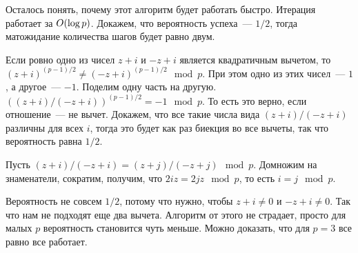 Осталось понять, почему этот алгоритм будет работать быстро. Итерация работает за $O(\log p)$. Докажем, что вероятность успеха~--- $1/2$, тогда матожидание количества шагов будет равно двум.

Если ровно одно из чисел $z + i$ и $-z + i$ является квадратичным вычетом, то $(z + i)^{(p-1)/2} \neq (-z + i)^{(p-1)/2} \mod p$. При этом одно из этих чисел~--- $1$, а другое~--- $-1$.
Поделим одну часть на другую. $((z+i)/(-z+i))^{(p-1)/2} = -1 \mod p$. То есть это верно, если отношение~--- не вычет. Докажем, что все такие числа вида $(z+i)/(-z+i)$ различны для всех $i$, тогда это будет как раз биекция во все вычеты, так что вероятность равна $1/2$.

Пусть $(z +i)/(-z+i) = (z+j)/(-z+j) \mod p$. Домножим на знаменатели, сократим, получим, что $2iz = 2jz \mod p$, то есть $i = j \mod p$.

Вероятность не совсем $1/2$, потому что нужно, чтобы $z + i \neq 0$ и $-z + i \neq 0$. Так что нам не подходят еще два вычета. Алгоритм от этого не страдает, просто для малых $p$ вероятность становится чуть меньше. Можно доказать, что для $p = 3$ все равно все работает.
